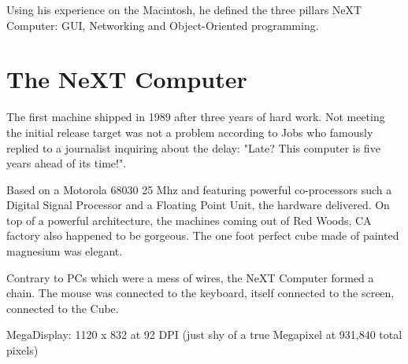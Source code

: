 \par
{}
\par
Using his experience on the Macintosh, he defined the three pillars NeXT Computer: GUI, Networking and Object-Oriented programming.\\
\par
{}

\par
\section{The NeXT Computer}
The first machine shipped in 1989 after three years of hard work. Not meeting the initial release target was not a problem according to Jobs who famously replied to a journalist inquiring about the delay: "Late? This computer is five years ahead of its time!".\\
\par
Based on a Motorola 68030 25 Mhz and featuring powerful co-processors such a Digital Signal Processor and a Floating Point Unit, the hardware delivered. On top of a powerful architecture, the machines coming out of Red Woods, CA factory also happened to be gorgeous. The one foot perfect cube made of painted magnesium was elegant.\\
\par
{}
\par
Contrary to PCs which were a mess of wires, the NeXT Computer formed a chain. The mouse was connected to the keyboard, itself connected to the screen, connected to the Cube.\\
\par

MegaDisplay: 1120 x 832 at 92 DPI (just shy of a true Megapixel at 931,840 total pixels)\\
\par
{}
\par

